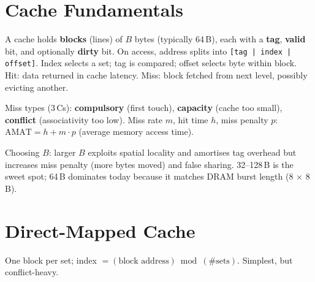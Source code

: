 \section{Cache Fundamentals}
A cache holds \textbf{blocks} (lines) of $B$ bytes (typically 64\,B), each with a \textbf{tag}, \textbf{valid} bit, and optionally \textbf{dirty} bit.
On access, address splits into \texttt{[tag | index | offset]}. Index selects a set; tag is compared; offset selects byte within block.
Hit: data returned in cache latency. Miss: block fetched from next level, possibly evicting another.

Miss types (3\,Cs): \textbf{compulsory} (first touch), \textbf{capacity} (cache too small), \textbf{conflict} (associativity too low). Miss rate $m$, hit time $h$, miss penalty $p$: $\text{AMAT}=h+m\cdot p$ (average memory access time).

Choosing $B$: larger $B$ exploits spatial locality and amortises tag overhead but increases miss penalty (more bytes moved) and false sharing. 32--128\,B is the sweet spot; 64\,B dominates today because it matches DRAM burst length (8 $\times$ 8\,B).

\section{Direct-Mapped Cache}
One block per set; index $= (\text{block address}) \bmod (\text{\#sets})$. Simplest, but conflict-heavy.
\begin{center}
\end{center}

